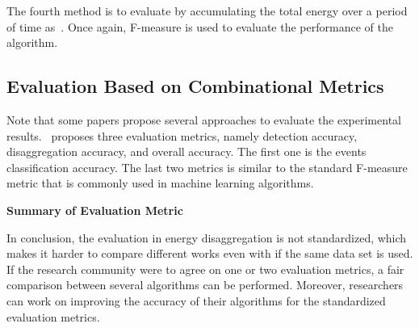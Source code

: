 The fourth method is to evaluate by accumulating  
the total energy over a period of time as~\cite{shao2012temporal}. Once again, F-measure is
used to evaluate the performance of the algorithm. 


\subsection{Evaluation Based on Combinational Metrics} 
Note that some papers propose several approaches to 
evaluate the experimental results.~\cite{liang2010load} proposes three evaluation metrics,
namely detection accuracy, disaggregation accuracy, and
overall accuracy. 
The first one is the events classification accuracy.
The last two metrics is similar to the standard F-measure metric that is commonly used
in machine learning algorithms.

\textbf{Summary of Evaluation Metric}
 
In conclusion, the evaluation in energy disaggregation 
is not standardized, which makes it harder to compare different works 
even with if the same data set is used. If the research community were to agree on one or
two evaluation metrics, a fair comparison between several algorithms can be performed. 
Moreover, researchers can work on improving the accuracy of their algorithms for the
standardized evaluation metrics.